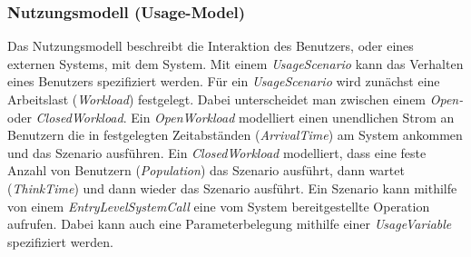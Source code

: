 \subsubsection{Nutzungsmodell (Usage-Model)}
Das Nutzungsmodell beschreibt die Interaktion des Benutzers, oder eines externen Systems, mit dem System. Mit einem \emph{UsageScenario} kann das Verhalten eines Benutzers spezifiziert werden. Für ein \emph{UsageScenario} wird zunächst eine Arbeitslast (\emph{Workload}) festgelegt. Dabei unterscheidet man zwischen einem \emph{Open-} oder \emph{ClosedWorkload}. Ein \emph{OpenWorkload} modelliert einen unendlichen Strom an Benutzern die in festgelegten Zeitabständen (\emph{ArrivalTime}) am System ankommen und das Szenario ausführen. Ein \emph{ClosedWorkload} modelliert, dass eine feste Anzahl von Benutzern (\emph{Population}) das Szenario ausführt, dann  wartet (\emph{ThinkTime}) und dann wieder das Szenario ausführt. Ein Szenario kann mithilfe von einem \emph{EntryLevelSystemCall} eine vom System bereitgestellte Operation aufrufen. Dabei kann auch eine Parameterbelegung mithilfe einer \emph{UsageVariable} spezifiziert werden. 

